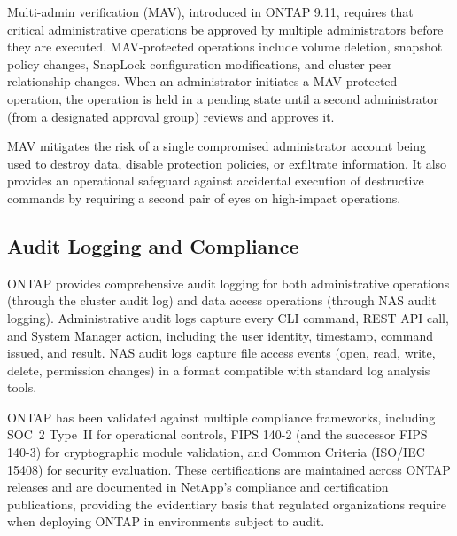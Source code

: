 \begin{securitybox}
Multi-admin verification (MAV), introduced in ONTAP 9.11, requires that critical administrative operations be approved by multiple administrators before they are executed. MAV-protected operations include volume deletion, snapshot policy changes, SnapLock configuration modifications, and cluster peer relationship changes. When an administrator initiates a MAV-protected operation, the operation is held in a pending state until a second administrator (from a designated approval group) reviews and approves it.

MAV mitigates the risk of a single compromised administrator account being used to destroy data, disable protection policies, or exfiltrate information. It also provides an operational safeguard against accidental execution of destructive commands by requiring a second pair of eyes on high-impact operations.

\subsection*{Audit Logging and Compliance}

ONTAP provides comprehensive audit logging for both administrative operations (through the cluster audit log) and data access operations (through NAS audit logging). Administrative audit logs capture every CLI command, REST API call, and System Manager action, including the user identity, timestamp, command issued, and result. NAS audit logs capture file access events (open, read, write, delete, permission changes) in a format compatible with standard log analysis tools.

ONTAP has been validated against multiple compliance frameworks, including SOC~2 Type~II for operational controls, FIPS 140-2 (and the successor FIPS 140-3) for cryptographic module validation, and Common Criteria (ISO/IEC 15408) for security evaluation. These certifications are maintained across ONTAP releases and are documented in NetApp's compliance and certification publications, providing the evidentiary basis that regulated organizations require when deploying ONTAP in environments subject to audit.

\end{securitybox}
